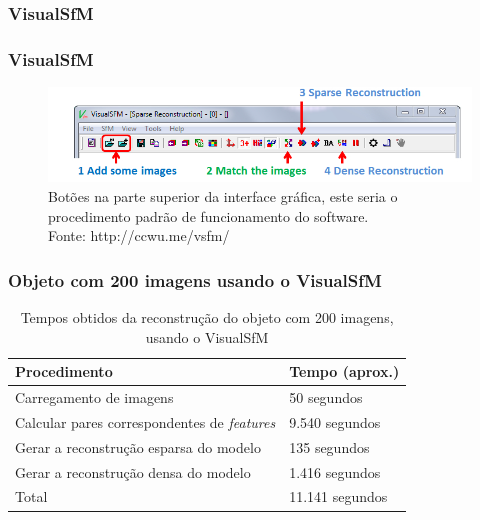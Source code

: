 \documentclass[table, usenames, svgnames, xcolor=dvipsnames]{beamer}
\begin{document}
\begin{frame}
	\begin{center}
	\end{center}
\end{frame}

\begin{frame}
	\begin{center}
	\end{center}
\end{frame}

\subsubsection{VisualSfM}

\begin{frame}
\frametitle{\textbf{VisualSfM}}
	\begin{figure}[!h]
		\centering
		\includegraphics[width=1\linewidth]{figs/pipelinevisualsfm.png}
		\caption{%
		Botões na parte superior da interface gráfica, este seria o procedimento padrão de funcionamento do software. \\
		\tiny{Fonte: http://ccwu.me/vsfm/}
		}
	\end{figure}
\end{frame}

\begin{frame}
\frametitle{\textbf{Objeto com 200 imagens usando o VisualSfM}}
	\begin{table}[h!]
		\caption{Tempos obtidos da reconstrução do objeto com 200 imagens, usando o VisualSfM}
		\begin{tabular}{|l|l|}
			\hline
			Procedimento & Tempo (aprox.) \\ \hline
			Carregamento de imagens & 50 segundos \\ \hline
			Calcular pares correspondentes de \protect\emph{features} & 9.540 segundos \\ \hline
			Gerar a reconstrução esparsa do modelo & 135 segundos \\ \hline
			Gerar a reconstrução densa do modelo & 1.416 segundos \\ \hline
			Total &  11.141 segundos\\ \hline
		\end{tabular}
	\end{table}
\end{frame}
\end{document}
